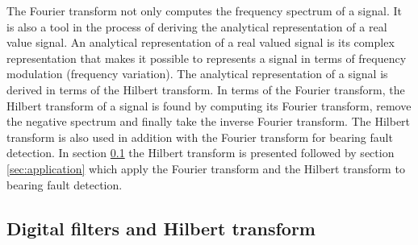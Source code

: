 \documentclass[../Main/thesis.tex]{subfiles}
\begin{document}
\justify
The Fourier transform not only computes the frequency spectrum of a signal. It is also a tool in the process of deriving the analytical representation of a real value signal. An analytical representation of a real valued signal is its complex representation that makes it possible to represents a signal in terms of frequency modulation (frequency variation). The analytical representation of a signal is derived in terms of the Hilbert transform. In terms of the Fourier transform, the Hilbert transform of a signal is found by computing its Fourier transform, remove the negative spectrum and finally take the inverse Fourier transform. The Hilbert transform is also used in addition with the Fourier transform for bearing fault detection. In section \ref{sec:hilbert-transform} the Hilbert transform is presented followed by section \ref{sec:application} which apply the Fourier transform and the Hilbert transform to bearing fault detection.
\subsection{Digital filters and Hilbert transform}
\label{sec:hilbert-transform}
\end{document}
